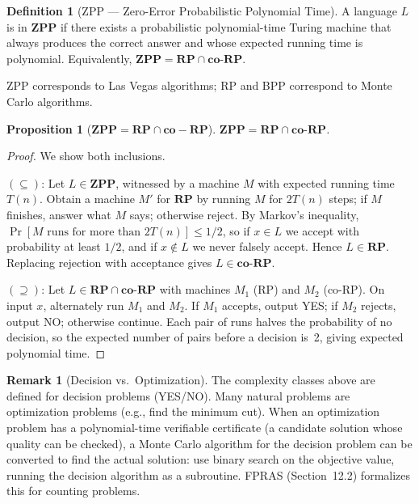 \documentclass[twoside,12pt]{book}
\theoremstyle{plain}
\newtheorem{proposition}[theorem]{Proposition}
\theoremstyle{definition}
\newtheorem{definition}[theorem]{Definition}
\newtheorem{remark}[theorem]{Remark}
\theoremstyle{remark}
\begin{document}
\begin{definition}[ZPP --- Zero-Error Probabilistic Polynomial Time]
A language $L$ is in \textbf{ZPP} if there exists a probabilistic
polynomial-time Turing machine that always produces the correct answer
and whose expected running time is polynomial. Equivalently,
$\textbf{ZPP} = \textbf{RP} \cap \textbf{co-RP}$.
\end{definition}

ZPP corresponds to Las Vegas algorithms; RP and BPP correspond to Monte
Carlo algorithms.

\begin{proposition}[$\mathbf{ZPP = RP \cap co-RP}$]
\label{prop:zpp}
$\textbf{ZPP} = \textbf{RP} \cap \textbf{co-RP}$.
\end{proposition}

\begin{proof}
We show both inclusions.

$(\subseteq)$: Let $L \in \mathbf{ZPP}$, witnessed by a machine $M$ with
expected running time $T(n)$. Obtain a machine $M'$ for $\mathbf{RP}$ by
running $M$ for $2T(n)$ steps; if $M$ finishes, answer what $M$ says;
otherwise reject. By Markov's inequality,
$\Pr[M \text{ runs for more than } 2T(n)] \leq 1/2$, so if $x \in L$ we
accept with probability at least $1/2$, and if $x \notin L$ we never
falsely accept. Hence $L \in \textbf{RP}$. Replacing rejection with
acceptance gives $L \in \textbf{co-RP}$.

$(\supseteq)$: Let $L \in \textbf{RP} \cap \textbf{co-RP}$ with
machines $M_1$ (RP) and $M_2$ (co-RP). On input $x$, alternately run
$M_1$ and $M_2$. If $M_1$ accepts, output YES; if $M_2$ rejects, output NO; otherwise continue. Each pair of runs halves the probability of
no decision, so the expected number of pairs before a decision is~2,
giving expected polynomial time.
\end{proof}

\begin{remark}[Decision vs.\ Optimization]
The complexity classes above are defined for decision problems (YES/NO). Many
natural problems are optimization problems (e.g., find the minimum cut). When
an optimization problem has a polynomial-time verifiable certificate (a
candidate solution whose quality can be checked), a Monte Carlo algorithm
for the decision problem can be converted to find the actual solution: use
binary search on the objective value, running the decision algorithm as a
subroutine. FPRAS (Section~12.2) formalizes this for counting problems.
\end{remark}
\end{document}
